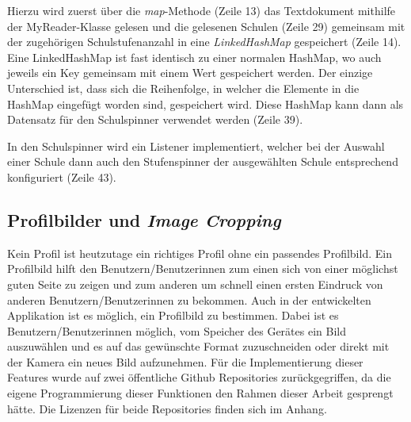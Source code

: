 \documentclass[../main.tex]{subfiles}
\begin{document}
	Hierzu wird zuerst über die \emph{map}-Methode (Zeile 13) das Textdokument mithilfe der MyReader-Klasse gelesen und die gelesenen Schulen (Zeile 29) gemeinsam mit der zugehörigen Schulstufenanzahl in eine \emph{LinkedHashMap} gespeichert (Zeile 14). Eine LinkedHashMap ist fast identisch zu einer normalen HashMap, wo auch jeweils ein Key gemeinsam mit einem Wert gespeichert werden. Der einzige Unterschied ist, dass sich die Reihenfolge, in welcher die Elemente in die HashMap eingefügt worden sind, gespeichert wird. Diese HashMap kann dann als Datensatz für den Schulspinner verwendet werden (Zeile 39).

	In den Schulspinner wird ein Listener implementiert, welcher bei der Auswahl einer Schule dann auch den Stufenspinner der ausgewählten Schule entsprechend konfiguriert (Zeile 43).

	\subsection{Profilbilder und \emph{Image Cropping}} \label{imageCropping}
	Kein Profil ist heutzutage ein richtiges Profil ohne ein passendes Profilbild. Ein Profilbild hilft den Benutzern/Benutzerinnen zum einen sich von einer möglichst guten Seite zu zeigen und zum anderen um schnell einen ersten Eindruck von anderen Benutzern/Benutzerinnen zu bekommen. Auch in der entwickelten Applikation ist es möglich, ein Profilbild zu bestimmen. Dabei ist es Benutzern/Benutzerinnen möglich, vom Speicher des Gerätes ein Bild auszuwählen und es auf das gewünschte Format zuzuschneiden oder direkt mit der Kamera ein neues Bild aufzunehmen. Für die Implementierung dieser Features wurde auf zwei öffentliche Github Repositories zurückgegriffen, da die eigene Programmierung dieser Funktionen den Rahmen dieser Arbeit gesprengt hätte. Die Lizenzen für beide Repositories finden sich im Anhang.
	
\end{document}
